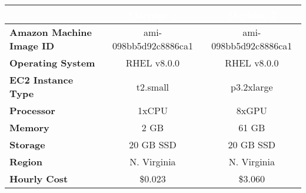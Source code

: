 \documentclass[10pt,journal,compsoc]{IEEEtran}
\begin{document}
\begin{table}
\renewcommand{\arraystretch}{1.5}
\centering
\begin{tabular}{|l|c|c|}
\hline
\rowcolor{exoctk_blue} & \textbf{\textcolor{white}{Machine 1}} & \textbf{\textcolor{white}{Machine 2}} \\
\hline
\textbf{Amazon Machine Image ID} & ami-098bb5d92c8886ca1 & ami-098bb5d92c8886ca1 \\
\hline
\textbf{Operating System} & RHEL v8.0.0 & RHEL v8.0.0 \\
\hline
\textbf{EC2 Instance Type} & t2.small & p3.2xlarge \\
\hline
\textbf{Processor} & 1xCPU & 8xGPU \\
\hline
\textbf{Memory} & 2 GB & 61 GB \\
\hline
\textbf{Storage} & 20 GB SSD & 20 GB SSD \\
\hline
\textbf{Region} & N. Virginia & N. Virginia \\
\hline
\textbf{Hourly Cost} & \$0.023 & \$3.060 \\
\hline
\end{tabular}
\end{table}
\end{document}
